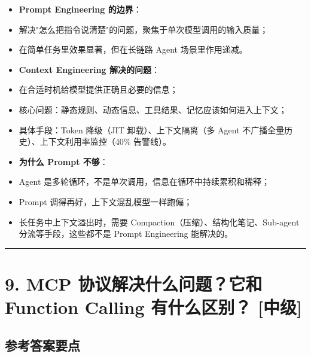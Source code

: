 \documentclass[9pt,a4paper,twocolumn]{ctexart}
\newcommand{\lvzhong}{\usebox{\badgezhongbox}}
\def\lvzhong{[中级]}%
\begin{document}
\begin{itemize}[itemsep=1pt, topsep=2pt]
  \item \textbf{Prompt Engineering 的边界}：
  \item 解决"怎么把指令说清楚"的问题，聚焦于单次模型调用的输入质量；
  \item 在简单任务里效果显著，但在长链路 Agent 场景里作用递减。
  \item \textbf{Context Engineering 解决的问题}：
  \item 在合适时机给模型提供正确且必要的信息；
  \item 核心问题：静态规则、动态信息、工具结果、记忆应该如何进入上下文；
  \item 具体手段：Token 降级（JIT 卸载）、上下文隔离（多 Agent 不广播全量历史）、上下文利用率监控（40\% 告警线）。
  \item \textbf{为什么 Prompt 不够}：
  \item Agent 是多轮循环，不是单次调用，信息在循环中持续累积和稀释；
  \item Prompt 调得再好，上下文混乱模型一样跑偏；
  \item 长任务中上下文溢出时，需要 Compaction（压缩）、结构化笔记、Sub-agent 分流等手段，这些都不是 Prompt Engineering 能解决的。
\end{itemize}


\vspace{2pt}
\noindent\rule{\columnwidth}{0.3pt}\vspace{2pt}



\section*{9. MCP 协议解决什么问题？它和 Function Calling 有什么区别？ \lvzhong{}}


\subsection*{参考答案要点}
\end{document}
